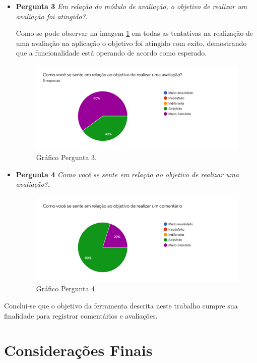 \documentclass[12pt, a4paper]{report}
\begin{document}
\begin{itemize}
\item{\textbf{ Pergunta 3}}
\textit{Em relação do módulo de avaliação, o objetivo de realizar um avaliação foi atingido?}.

Como se pode observar na imagem \ref{fig:grafico_pergunta3} em todas as tentativas na realização de uma avaliação na aplicação o objetivo foi atingido com exito, demostrando que a funcionalidade está operando de acordo como esperado.  

\begin{figure}
\centering
\includegraphics[scale=1.0]{grafico_pergunta3.png}
\caption{Gráfico Pergunta 3.}
\label{fig:grafico_pergunta3}
\end{figure}

\item{\textbf{ Pergunta 4}}
\textit{Como você se sente em relação ao objetivo de realizar uma avaliação?}.


\begin{figure}
\centering
\includegraphics[scale=1.0]{grafico_pergunta4.png}
\caption{Gráfico Pergunta 4}
\label{fig:grafico_pergunta4}
\end{figure}
\end{itemize}

Conclui-se que o objetivo da ferramenta descrita neste trabalho cumpre sua finalidade para registrar comentários e avaliações. 

\chapter{Considerações Finais}
\end{document}
